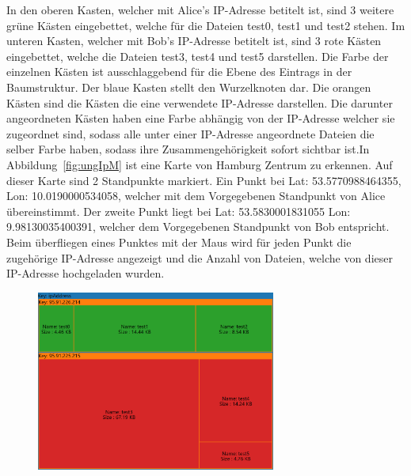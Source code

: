 \documentclass[
    fontsize=12pt,
    headings=small,
    parskip=half,           %
    bibliography=totoc,
    numbers=noenddot,       %
    open=any,               %
    ]{scrreprt}
\begin{document}
In den oberen Kasten, welcher mit Alice's IP-Adresse betitelt ist, sind 3 weitere grüne Kästen eingebettet, welche für die Dateien test0, test1 und test2 stehen.
Im unteren Kasten, welcher mit Bob's IP-Adresse betitelt ist, sind 3 rote Kästen eingebettet, welche die Dateien test3, test4 und test5 darstellen.
Die Farbe der einzelnen Kästen ist ausschlaggebend für die Ebene des Eintrags in der Baumstruktur.
Der blaue Kasten stellt den Wurzelknoten dar.
Die orangen Kästen sind die Kästen die eine verwendete IP-Adresse darstellen.
Die darunter angeordneten Kästen haben eine Farbe abhängig von der IP-Adresse welcher sie zugeordnet sind, sodass alle unter einer IP-Adresse angeordnete Dateien die selber Farbe haben, sodass ihre Zusammengehörigkeit sofort sichtbar ist.In Abbildung~\ref{fig:ungIpM} ist eine Karte von Hamburg Zentrum zu erkennen.
Auf dieser Karte sind 2 Standpunkte markiert.
Ein Punkt bei Lat: 53.5770988464355, Lon: 10.0190000534058, welcher mit dem Vorgegebenen Standpunkt von Alice übereinstimmt.
Der zweite Punkt liegt bei Lat: 53.5830001831055 Lon: 9.98130035400391, welcher dem Vorgegebenen Standpunkt von Bob entspricht.
Beim überfliegen eines Punktes mit der Maus wird für jeden Punkt die zugehörige IP-Adresse angezeigt und die Anzahl von Dateien, welche von dieser IP-Adresse hochgeladen wurden.

\begin{figure}[H]
\includegraphics[width=0.7\textwidth]{../pic/IP-Proxy-SetA-tree2.PNG}
\label{fig:ungIpTM}
\end{figure}
\end{document}
